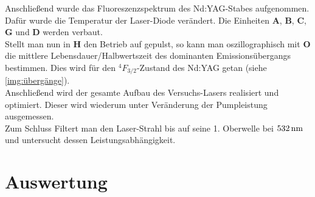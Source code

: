 \documentclass[numbers=noenddot,12pt,a4paper]{scrartcl}
\newcommand{\ix}[1]{_\text{#1}}
\newcommand{\fett}[1]{\textbf{#1}}
\begin{document}
Anschließend wurde das Fluoreszenzspektrum des Nd:YAG-Stabes aufgenommen. Dafür wurde die Temperatur der Laser-Diode verändert. Die Einheiten \fett{A}, \fett{B}, \fett{C}, \fett{G} und \fett{D} werden verbaut.\\
Stellt man nun in \fett{H} den Betrieb auf gepulst, so kann man oszillographisch mit \fett{O} die mittlere Lebensdauer/Halbwertszeit des dominanten Emissionsübergangs bestimmen. Dies wird für den $^{4}F\ix{3/2}$-Zustand des Nd:YAG getan (siehe \ref{img:übergänge}).\\
Anschließend wird der gesamte Aufbau des Versuchs-Lasers realisiert und optimiert. Dieser wird wiederum unter Veränderung der Pumpleistung ausgemessen.\\
Zum Schluss Filtert man den Laser-Strahl bis auf seine 1. Oberwelle bei $\unit[532]{nm}$ und untersucht dessen Leistungsabhängigkeit.
\pagebreak
\section{Auswertung}\label{sec:auswert}
\end{document}
